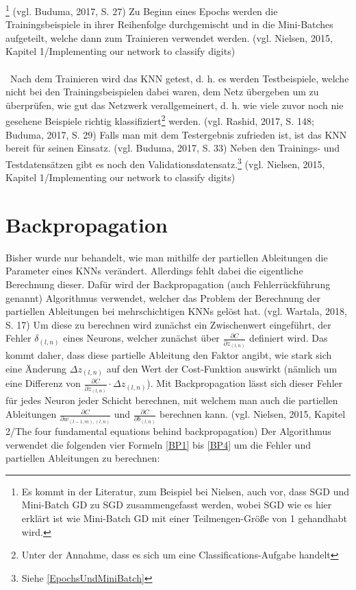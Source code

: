 \documentclass[a4paper,12pt,ngerman,oneside]{scrreprt}	%
\newcommand{\fundamentals}[1]{(vgl. Buduma, 2017, S. {#1})}
\begin{document}
			\footnote{Es kommt in der Literatur, zum Beispiel bei Nielsen, auch vor, dass SGD und Mini-Batch GD zu SGD zusammengefasst werden, wobei SGD wie es hier erklärt ist wie Mini-Batch GD mit einer Teilmengen-Größe von 1 gehandhabt wird.} \fundamentals{27} Zu Beginn eines Epochs werden die Trainingsbeispiele in ihrer Reihenfolge durchgemischt und in die Mini-Batches aufgeteilt, welche dann zum Trainieren verwendet werden. (vgl. Nielsen, 2015, Kapitel 1/Implementing our network to classify digits)
			\\\
			\\\
			Nach dem Trainieren wird das KNN getest, d. h. es werden Testbeispiele, welche nicht bei den Trainingsbeispielen dabei waren, dem Netz übergeben um zu überprüfen, wie gut das Netzwerk verallgemeinert, d. h. wie viele zuvor noch nie gesehene Beispiele richtig klassifiziert\footnote{Unter der Annahme, dass es sich um eine Classifications-Aufgabe handelt} werden. (vgl. Rashid, 2017, S. 148; Buduma, 2017, S. 29) Falls man mit dem Testergebnis zufrieden ist, ist das KNN bereit für seinen Einsatz. \fundamentals{33} Neben den Trainings- und Testdatensätzen gibt es noch den Validationsdatensatz.\footnote{Siehe \ref{EpochsUndMiniBatch}} (vgl. Nielsen, 2015, Kapitel 1/Implementing our network to classify digits)
		
		\section{Backpropagation} \label{Backpropagation}
			Bisher wurde nur behandelt, wie man mithilfe der partiellen Ableitungen die Parameter eines KNNs verändert. Allerdings fehlt dabei die eigentliche Berechnung dieser. Dafür wird der Backpropagation (auch Fehlerrückführung genannt) Algorithmus verwendet, welcher das Problem der Berechnung der partiellen Ableitungen bei mehrschichtigen KNNs gelöst hat. (vgl. Wartala, 2018, S. 17) Um diese zu berechnen wird zunächst ein Zwischenwert eingeführt, der Fehler $\delta_{(l,n)}$ eines Neurons, welcher zunächst über $\frac{\partial C}{\partial z_{(l,n)}}$ definiert wird. Das kommt daher, dass diese partielle Ableitung den Faktor angibt, wie stark sich eine Änderung $\Delta z_{(l,n)}$ auf den Wert der Cost-Funktion auswirkt (nämlich um eine Differenz von $\frac{\partial C}{\partial z_{(l,n)}} \cdot \Delta z_{(l,n)}$). Mit Backpropagation lässt sich dieser Fehler für jedes Neuron jeder Schicht berechnen, mit welchem man auch die partiellen Ableitungen $\frac{\partial C}{\partial w_{(l-1,m),(l,n)}}$ und $\frac{\partial C}{\partial b_{(l,n)}}$ berechnen kann. (vgl. Nielsen, 2015, Kapitel 2/The four fundamental equations behind backpropagation) Der Algorithmus verwendet die folgenden vier Formeln \ref{BP1} bis \ref{BP4} um die Fehler und partiellen Ableitungen zu berechnen: 
\end{document}
